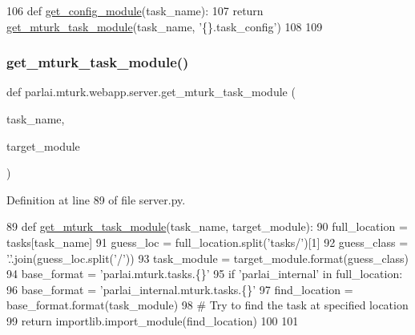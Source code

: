 \begin{DoxyCode}
106 \textcolor{keyword}{def }\hyperlink{namespaceparlai_1_1mturk_1_1webapp_1_1server_aee065cfdb6346d4815762ae793427f1e}{get\_config\_module}(task\_name):
107     \textcolor{keywordflow}{return} \hyperlink{namespaceparlai_1_1mturk_1_1webapp_1_1server_a0c7e088cb9401f94297c2ae96dce3ec2}{get\_mturk\_task\_module}(task\_name, \textcolor{stringliteral}{'\{\}.task\_config'})
108 
109 
\end{DoxyCode}
\mbox{\label{namespaceparlai_1_1mturk_1_1webapp_1_1server_a0c7e088cb9401f94297c2ae96dce3ec2}} 
\subsubsection{\texorpdfstring{get\+\_\+mturk\+\_\+task\+\_\+module()}{get\_mturk\_task\_module()}}
{\footnotesize\ttfamily def parlai.\+mturk.\+webapp.\+server.\+get\+\_\+mturk\+\_\+task\+\_\+module (\begin{DoxyParamCaption}\item[{}]{task\+\_\+name,  }\item[{}]{target\+\_\+module }\end{DoxyParamCaption})}



Definition at line 89 of file server.\+py.


\begin{DoxyCode}
89 \textcolor{keyword}{def }\hyperlink{namespaceparlai_1_1mturk_1_1webapp_1_1server_a0c7e088cb9401f94297c2ae96dce3ec2}{get\_mturk\_task\_module}(task\_name, target\_module):
90     full\_location = tasks[task\_name]
91     guess\_loc = full\_location.split(\textcolor{stringliteral}{'tasks/'})[1]
92     guess\_class = \textcolor{stringliteral}{'.'}.join(guess\_loc.split(\textcolor{stringliteral}{'/'}))
93     task\_module = target\_module.format(guess\_class)
94     base\_format = \textcolor{stringliteral}{'parlai.mturk.tasks.\{\}'}
95     \textcolor{keywordflow}{if} \textcolor{stringliteral}{'parlai\_internal'} \textcolor{keywordflow}{in} full\_location:
96         base\_format = \textcolor{stringliteral}{'parlai\_internal.mturk.tasks.\{\}'}
97     find\_location = base\_format.format(task\_module)
98     \textcolor{comment}{# Try to find the task at specified location}
99     \textcolor{keywordflow}{return} importlib.import\_module(find\_location)
100 
101 
\end{DoxyCode}
\mbox{\label{namespaceparlai_1_1mturk_1_1webapp_1_1server_abf5dde99069f271f98bd20e7fb7cdccd}} 
